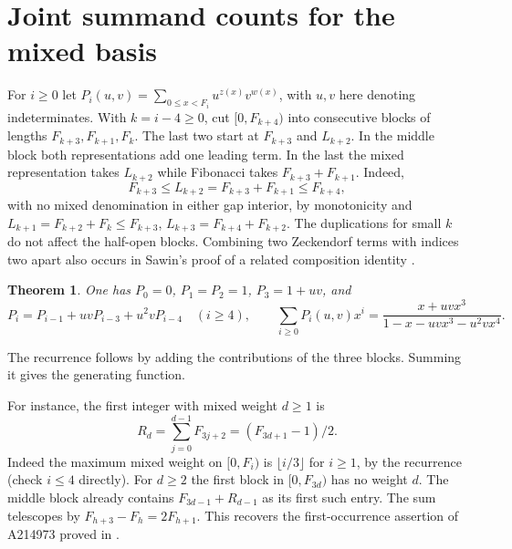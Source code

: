 \documentclass[10pt]{article}
\newtheorem{theorem}{Theorem}[section]
\begin{document}
\clearpage
\section{Joint summand counts for the mixed basis}
For $i\ge0$ let $P_i(u,v)=\sum_{0\le x<F_i}u^{z(x)}v^{w(x)}$, with $u,v$ here denoting indeterminates. With $k=i-4\ge0$, cut $[0,F_{k+4})$ into consecutive blocks of lengths $F_{k+3},F_{k+1},F_k$. The last two start at $F_{k+3}$ and $L_{k+2}$. In the middle block both representations add one leading term. In the last the mixed representation takes $L_{k+2}$ while Fibonacci takes $F_{k+3}+F_{k+1}$. Indeed,
\[
 F_{k+3}\le L_{k+2}=F_{k+3}+F_{k+1}\le F_{k+4},
\]
with no mixed denomination in either gap interior, by monotonicity and $L_{k+1}=F_{k+2}+F_k\le F_{k+3}$, $L_{k+3}=F_{k+4}+F_{k+2}$. The duplications for small $k$ do not affect the half-open blocks. Combining two Zeckendorf terms with indices two apart also occurs in Sawin's proof of a related composition identity \cite{sawin}.

\begin{theorem}\label{gf}
One has $P_0=0$, $P_1=P_2=1$, $P_3=1+uv$, and
\[
 P_i=P_{i-1}+uvP_{i-3}+u^2vP_{i-4}\quad(i\ge4),\qquad
 \sum_{i\ge0}P_i(u,v)x^i=\frac{x+uvx^3}{1-x-uvx^3-u^2vx^4}.
\]
\end{theorem}
The recurrence follows by adding the contributions of the three blocks. Summing it gives the generating function.

For instance, the first integer with mixed weight $d\ge1$ is
\[
 R_d=\sum_{j=0}^{d-1}F_{3j+2}=(F_{3d+1}-1)/2 .
\]
Indeed the maximum mixed weight on $[0,F_i)$ is $\lfloor i/3\rfloor$ for $i\ge1$, by the recurrence (check $i\le4$ directly). For $d\ge2$ the first block in $[0,F_{3d})$ has no weight $d$. The middle block already contains $F_{3d-1}+R_{d-1}$ as its first such entry. The sum telescopes by $F_{h+3}-F_h=2F_{h+1}$. This recovers the first-occurrence assertion of A214973 proved in \cite{bb}.
\end{document}

